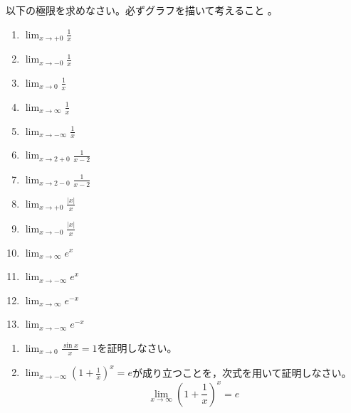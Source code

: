 \documentclass[twocolumn,11pt]{jarticle}
\begin{document}
\nquestion
以下の極限を求めなさい。必ずグラフを描いて考えること
。
\begin{enumerate}
\item \label{litem:(x->+0)1/x}$\displaystyle\lim_{x\to+0}\frac{1}{x}$
\item \label{litem:(x->-0)1/x}$\displaystyle\lim_{x\to-0}\frac{1}{x}$
\item \label{litem:(x->0)1/x}$\displaystyle\lim_{x\to 0}\frac{1}{x}$
\item \label{litem:(x->infty)1/x}$\displaystyle\lim_{x\to\infty}\frac{1}{x}$
\item \label{litem:(x->-infty)1/x}$\displaystyle\lim_{x\to-\infty}\frac{1}{x}$
\item \label{litem:(x->2+0)1/x-2}$\displaystyle\lim_{x\to 2+0}\frac{1}{x-2}$
\item \label{litem:(x->2-0)1/x-2}$\displaystyle\lim_{x\to 2-0}\frac{1}{x-2}$
\item \label{litem:(x->+0)|x|/x}$\displaystyle\lim_{x\to+0}\frac{|x|}{x}$
\item \label{litem:(x->-0)|x|/x}$\displaystyle\lim_{x\to-0}\frac{|x|}{x}$
\item \label{litem:(x->infty)e^x}$\displaystyle\lim_{x\to\infty}e^x$
\item \label{litem:(x->-infty)e^x}$\displaystyle\lim_{x\to-\infty}e^x$
\item \label{litem:(x->infty)e^-x}$\displaystyle\lim_{x\to\infty}e^{-x}$
\item \label{litem:(x->-infty)e^-x}$\displaystyle\lim_{x\to-\infty}e^{-x}$
\end{enumerate}

\nquestion
\begin{enumerate}
  \item $\displaystyle\lim_{x\to 0}\frac{\sin x}{x}=1$を証明しなさい。
  \item $\displaystyle\lim_{x\to -\infty}\left(1+\frac{1}{x}\right)^x=e$が成り立つことを，次式を用いて証明しなさい。
  $$\displaystyle\lim_{x\to\infty}\left(1+\frac{1}{x}\right)^x=e$$
\end{enumerate}
\end{document}
